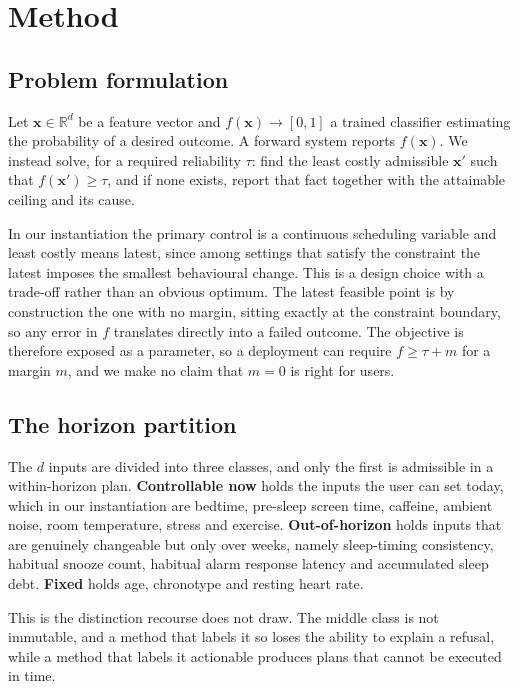 \documentclass[conference]{IEEEtran}
\begin{document}
\section{Method}
\label{sec:method}

\subsection{Problem formulation}

Let $\mathbf{x} \in \mathbb{R}^d$ be a feature vector and
$f(\mathbf{x}) \rightarrow [0,1]$ a trained classifier estimating the
probability of a desired outcome. A forward system reports $f(\mathbf{x})$. We
instead solve, for a required reliability $\tau$: find the least costly
admissible $\mathbf{x}'$ such that $f(\mathbf{x}') \ge \tau$, and if none
exists, report that fact together with the attainable ceiling and its cause.

In our instantiation the primary control is a continuous scheduling variable and
least costly means latest, since among settings that satisfy the constraint the
latest imposes the smallest behavioural change. This is a design choice with a
trade-off rather than an obvious optimum. The latest feasible point is by
construction the one with no margin, sitting exactly at the constraint boundary,
so any error in $f$ translates directly into a failed outcome. The objective is
therefore exposed as a parameter, so a deployment can require
$f \ge \tau + m$ for a margin $m$, and we make no claim that $m = 0$ is right
for users.

\subsection{The horizon partition}

The $d$ inputs are divided into three classes, and only the first is admissible
in a within-horizon plan. \textbf{Controllable now} holds the inputs the user
can set today, which in our instantiation are bedtime, pre-sleep screen time,
caffeine, ambient noise, room temperature, stress and exercise.
\textbf{Out-of-horizon} holds inputs that are genuinely changeable but only over
weeks, namely sleep-timing consistency, habitual snooze count, habitual alarm
response latency and accumulated sleep debt. \textbf{Fixed} holds age,
chronotype and resting heart rate.

This is the distinction recourse does not draw. The middle class is not
immutable, and a method that labels it so loses the ability to explain a
refusal, while a method that labels it actionable produces plans that cannot be
executed in time.
\end{document}
